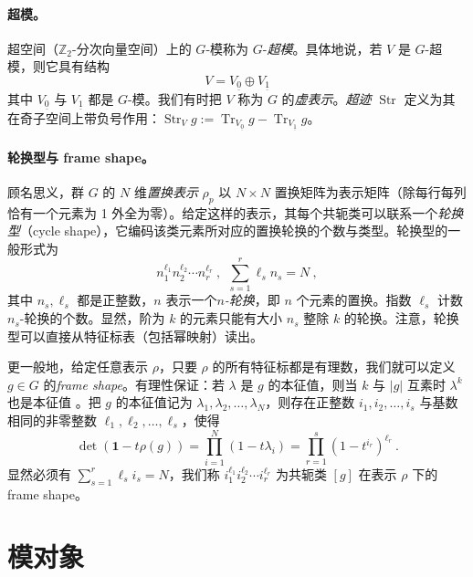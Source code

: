 \documentclass[11pt,a4paper,fontset=windows]{ctexart}
\numberwithin{equation}{section}
\newcommand{\myparagraph}[1]{\paragraph{#1}\mbox\\}
\newcommand{\ZZ}{\mathbb{Z}}
\def\l{\lambda}
\def\rr{\rho}
\newcommand{\tr}{\operatorname{Tr}}
\newcommand{\str}{\operatorname{Str}}
\newcommand{\be}{\begin{equation}}
\newcommand{\ee}{\end{equation}}
\begin{document}
\myparagraph{超模。}
超空间（$\ZZ_2$-分次向量空间）上的 $G$-模称为 $G$-\emph{超模}。具体地说，若 $V$ 是 $G$-超模，则它具有结构
\be\label{def:supermodule}
V  = V_{\underline{0}} \oplus V_{\underline{1}}
\ee
其中 $V_{\underline{0}}$ 与 $V_{\underline{1}}$ 都是 $G$-模。我们有时把 $V$ 称为 $G$ 的\emph{虚表示}。\emph{超迹} ${\str}$ 定义为其在奇子空间上带负号作用：${\str}_V g := \tr_{V_{\underline{0}}} g-\tr_{V_{\underline{1}}}g$。

\myparagraph{轮换型与 frame shape。}
顾名思义，群 $G$ 的 $N$ 维\emph{置换表示} $\rr_p$ 以 $N\times N$ 置换矩阵为表示矩阵（除每行每列恰有一个元素为 1 外全为零）。给定这样的表示，其每个共轭类可以联系一个\emph{轮换型}（cycle shape），它编码该类元素所对应的置换轮换的个数与类型。轮换型的一般形式为
\begin{equation}
n_1^{\ell_1}n_2^{\ell_2}\cdots n_r^{\ell_r}~,~~\sum_{s=1}^r\ell_s n_s=N~, 
\end{equation}
其中 $n_s, \ell_s$ 都是正整数，$n$ 表示一个\emph{$n$-轮换}，即 $n$ 个元素的置换。指数 $\ell_s$ 计数 $n_s$-轮换的个数。显然，阶为 $k$ 的元素只能有大小 $n_s$ 整除 $k$ 的轮换。注意，轮换型可以直接从特征标表（包括幂映射）读出。

更一般地，给定任意表示 $\rho$，只要 $\rho$ 的所有特征标都是有理数，我们就可以定义 $g\in G$ 的\emph{frame shape}。有理性保证：若 $\lambda$ 是 $g$ 的本征值，则当 $k$ 与 $|g|$ 互素时 $\lambda^k$ 也是本征值 \cite{MasonGeoffrey1984Farc}。把 $g$ 的本征值记为 $\l_1, \l_2,\dots ,\l_N$，则存在正整数 $i_1,i_2,\dots,i_s$ 与基数相同的非零整数 $\ell_1,\ell_2,\dots,\ell_s$，使得
\begin{equation}
\det(\mathbf{1}-t\rho(g))=\prod_{i=1}^N(1-t\lambda_i)=\prod_{r=1}^s(1-t^{i_r})^{\ell_r}~.
\end{equation}
显然必须有 $\sum_{s=1}^r\ell_s i_s=N$，我们称
$
i_1^{\ell_1}i_2^{\ell_2}\cdots i_r^{\ell_r}
$
为共轭类 $[g]$ 在表示 $\rho$ 下的 frame shape。



\section{模对象}
\label{sec:modular}
\end{document}
